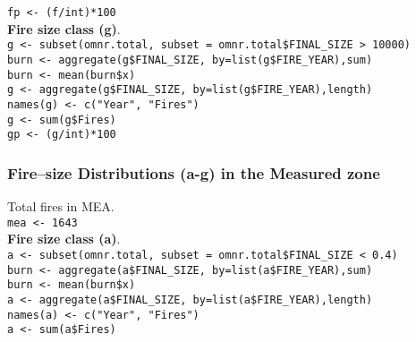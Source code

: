\begin{spacing}{1.5}
\noindent \texttt{fp <- (f/int)*100} \\

\noindent \textbf{Fire size class (g)}. \\

\noindent \texttt{g <- subset(omnr.total, subset = omnr.total\$FINAL\_SIZE > 10000)} \\

\noindent \texttt{burn <- aggregate(g\$FINAL\_SIZE, by=list(g\$FIRE\_YEAR),sum)} \\

\noindent \texttt{burn <- mean(burn\$x)} \\
               
\noindent \texttt{g <- aggregate(g\$FINAL\_SIZE, by=list(g\$FIRE\_YEAR),length)} \\

\noindent \texttt{names(g) <- c("Year", "Fires")} \\

\noindent \texttt{g <- sum(g\$Fires)} \\

\noindent \texttt{gp <- (g/int)*100}

\subsubsection{Fire--size Distributions (a-g) in the Measured zone}
\noindent Total fires in MEA. \\

\noindent \texttt{mea <- 1643} \\

\noindent \textbf{Fire size class (a)}. \\

\noindent \texttt{a <- subset(omnr.total, subset = omnr.total\$FINAL\_SIZE < 0.4)} \\

\noindent \texttt{burn <- aggregate(a\$FINAL\_SIZE, by=list(a\$FIRE\_YEAR),sum)} \\

\noindent \texttt{burn <- mean(burn\$x)} \\
                     
\noindent \texttt{a <- aggregate(a\$FINAL\_SIZE, by=list(a\$FIRE\_YEAR),length)} \\

\noindent \texttt{names(a) <- c("Year", "Fires")} \\

\noindent \texttt{a <- sum(a\$Fires)} \\


\end{spacing}
